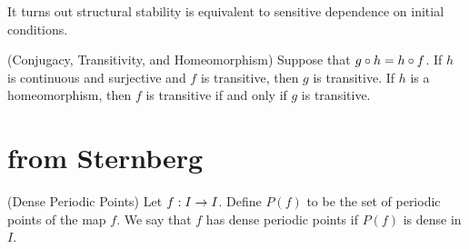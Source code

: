 \documentclass[11pt]{article}
\begin{document}
It turns out structural stability is equivalent to sensitive dependence
on initial conditions.

\begin{proposition}
  (Conjugacy, Transitivity, and Homeomorphism) 
  Suppose that $g \circ h = h \circ f$. If $h$ is continuous and
  surjective and $f$ is transitive, then $g$ is transitive.
  If $h$ is a homeomorphism, then $f$ is transitive if and only if
  $g$ is transitive.
\end{proposition}

\section{from Sternberg}

\begin{definition}
  (Dense Periodic Points) Let $f: I \rightarrow I$. Define $P(f)$ to be the set of periodic points
  of the map $f$. We say that $f$ has dense periodic points if $P(f)$ is
  dense in $I$.
\end{definition}
\end{document}
